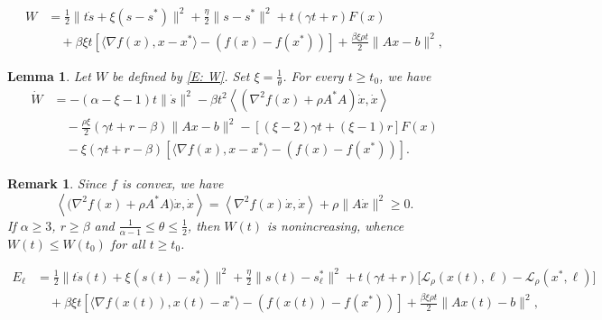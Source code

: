 \documentclass[10pt,a4paper]{amsart}
\newtheorem{lemma}{Lemma}
\newtheorem{remark}{Remark}
\begin{document}
\begin{equation}\label{E: W}
\begin{aligned}
W &= \frac{1}{2}\| t\dot{s} + \xi(s-s^*) \|^2 + \frac{\eta}{2}\| s-s^* \|^2 + t(\gamma t + r) F(x) \\ 
&\quad + \beta\xi t \left[ \langle \nabla f(x), x-x^* \rangle - \left( f(x) - f(x^*) \right) \right] 
 + \frac{\beta\xi \rho t}{2}\| Ax-b \|^2,
\end{aligned}
\end{equation}

\begin{lemma}\label{Lem: epsilon_dev}
Let $W$ be defined by \eqref{E: W}. Set $\xi = \frac{1}{\theta}$. For every $t\ge t_0$, we have
\begin{align*}
\dot{W}
&= -(\alpha-\xi-1)t\| \dot{s} \|^2
   -\beta t^2 \left\langle \left( \nabla^2 f(x) + \rho A^* A \right)\dot{x}, \dot{x} \right\rangle \\
&\quad - \frac{\rho\xi}{2}( \gamma t + r - \beta ) \| Ax-b \|^2   
  - [ (\xi-2)\gamma t + (\xi-1)r ] F(x) \\
&\quad -\xi( \gamma t + r - \beta ) \left[ \langle \nabla f(x), x-x^* \rangle - \left( f(x) - f(x^*) \right) \right].
\end{align*}
\end{lemma}

\begin{remark}\label{Rem: epsilon_dev_bound}
Since $f$ is convex, we have 
$$ \left\langle \big( \nabla^2 f(x) + \rho A^* A \big)\dot{x}, \dot{x} \right\rangle 
= \left\langle \nabla^2 f(x) \dot{x}, \dot{x} \right\rangle + \rho \| A\dot{x} \|^2 \ge 0.$$
If $\alpha\ge 3$, $r\ge\beta$ and $\frac{1}{\alpha-1}\le \theta \le \frac{1}{2}$, then $W(t)$ is nonincreasing, whence $W(t)\le W(t_0)$ for all $t\ge t_0$.
\end{remark}

\begin{equation}\label{E: epsilon_bar}
\begin{aligned}
E_\ell
&= \frac{1}{2}\| t\dot{s}(t) + \xi(s(t)-s_\ell^*) \|^2 + \frac{\eta}{2}\| s(t)-s_\ell^* \|^2
  + t(\gamma t + r) \big[ \mathcal{L}_\rho\left(x(t),\ell\right) - \mathcal{L}_\rho(x^*,\ell)\big] \\
&\quad + \beta\xi t \left[ \langle \nabla f(x(t)), x(t)-x^* \rangle - \left( f(x(t)) - f(x^*) \right) \right] 
  + \frac{\beta\xi \rho t}{2}\| Ax(t)-b \|^2,
\end{aligned}
\end{equation}
\end{document}
